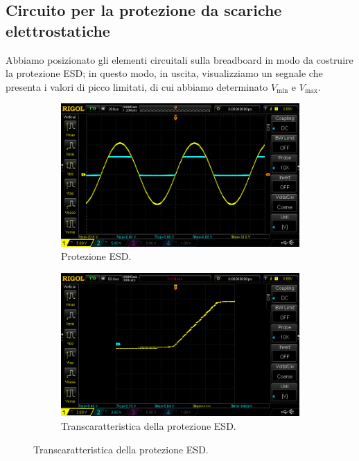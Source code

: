 \documentclass[a4paper]{article}
\begin{document}
		\subsection{Circuito per la protezione da scariche elettrostatiche}
			Abbiamo posizionato gli elementi circuitali sulla breadboard in modo da costruire la protezione ESD; in questo modo, in uscita, visualizziamo un segnale che presenta i valori di picco limitati, di cui abbiamo determinato $ V_{\mathrm{min}} $ e $ V_{\mathrm{max}} $.
			\begin{figure}[h!]
				\centering
				\begin{subfigure}{0.4\textwidth}
					\centering
					\includegraphics[scale=0.2]{protezioneESD}
					\caption{Protezione ESD.}
				\end{subfigure}
				\begin{subfigure}{0.4\textwidth}
					\centering
					\includegraphics[scale=0.2]{protezioneESDTranscaratteristica}
					\caption{Transcaratteristica della protezione ESD.}
				\end{subfigure}
				\label{fig:protezioneESD}
			\end{figure}
\end{document}
